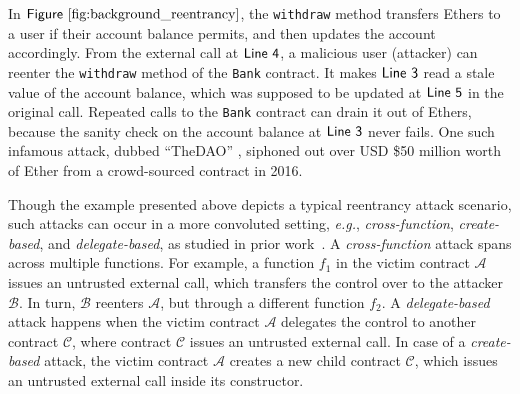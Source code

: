 \documentclass[conference, romanappendices]{tex/IEEEtran}
\theoremstyle{bfnote}
\newcommand{\ether}{{Ether}\xspace}
\newcommand{\reentrancy}{{reentrancy}\xspace}
\newcommand{\eg}{\textit{e.g.}}
\newcommand{\Line}[1]{\ensuremath{\sf Line~ #1}}
\newcommand{\Fig}[1]{\ensuremath{\sf Figure~\ref{#1}}}
\begin{document}
In \Fig{fig:background_reentrancy},
the \texttt{withdraw} method transfers {Ethers\EndAccSupp{}} to a user if their account balance permits, and then updates the account accordingly.
From the external call at \Line{4}, a malicious user (attacker) can reenter the \texttt{withdraw} method of the \texttt{Bank} contract.
It makes \Line{3} read a {stale\EndAccSupp{}} value of the account balance, which was supposed to be updated at \Line{5} in the original call.
Repeated calls to the \texttt{Bank} contract can {drain\EndAccSupp{}} it out of {Ethers\EndAccSupp{}}, because the sanity check on the account balance at \Line{3} never fails.
One such {infamous\EndAccSupp{}} attack, dubbed ``TheDAO'' \cite{dao-attack}, siphoned out over {USD\EndAccSupp{}} \$50 million worth of \ether from a crowd-sourced contract in 2016.

Though the example presented above depicts a typical \reentrancy attack scenario, such attacks can occur in a more convoluted setting, \eg, \textit{cross-function}, \textit{create-based}, and \textit{delegate-based}, as studied in prior work~\cite{sereum}.
A \textit{cross-function} attack spans across multiple functions.
For example, a function $f_1$ in the victim contract $\mathcal{A}$ issues an untrusted external call, which transfers the control over to the attacker  $\mathcal{B}$.
In turn, $\mathcal{B}$ reenters $\mathcal{A}$, but through a different function $f_2$.
A \textit{delegate-based} attack happens when the victim contract $\mathcal{A}$ delegates the control to another contract $\mathcal{C}$, where contract $\mathcal{C}$ issues an untrusted external call.
In case of a \textit{create-based} attack, the victim contract $\mathcal{A}$ creates a new child contract $\mathcal{C}$, which issues an untrusted external call inside its constructor.
\end{document}
